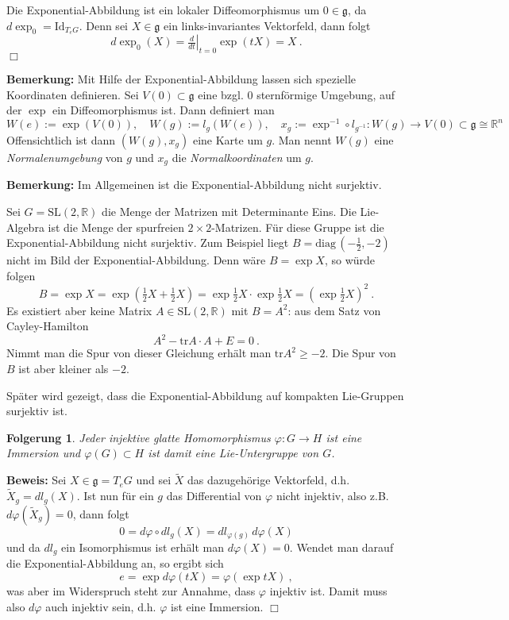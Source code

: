\documentclass[12pt,a4paper]{article}
\def\R{\mathbb{R}}
\def\SL{\mathrm{SL}}
\def\g{\mathfrak{g}}
\def\diag{\mathrm{diag}\,}
\def\tr{\mathrm{tr}}
\def\Id{\mathrm{Id}}
\newtheorem{Folgerung}[Lemma]{Folgerung}
\def\proof{\noindent\textbf{Beweis:}\quad}
\def\qed{\quad\hfill\ensuremath{\Box}}
\begin{document}
\medskip

Die Exponential-Abbildung ist ein lokaler Diffeomorphismus um $0 \in \g$, da $d \exp_0 = \Id_{T_eG}$. Denn
sei $X\in \g$ ein links-invariantes Vektorfeld, dann folgt
$$
d \exp_0 (X) =\left. \tfrac{d}{dt}\right|_{t=0} \exp(tX) = X \ .
$$
\qed

\bigskip

{\bf Bemerkung:}
Mit Hilfe der Exponential-Abbildung lassen sich spezielle Koordinaten definieren. Sei
$V(0) \subset \g$ eine bzgl. $0$ sternf\"ormige Umgebung, auf der $\exp$ ein
Diffeomorphismus ist. Dann definiert man
$$
W(e) := \exp (V(0)), \quad W(g) := l_g(W(e)), \quad x_g:= \exp^{-1}\circ l_{g^{-1}}:W(g) \rightarrow V(0)\subset \g \cong \R^n
$$
Offensichtlich ist dann $(W(g), x_g)$ eine Karte um $g$. Man nennt $W(g)$ eine {\it Normalenumgebung} von $g$ und $x_g$ die
{\it Normalkoordinaten} um $g$.

\bigskip

{\bf Bemerkung:}
Im Allgemeinen ist die Exponential-Abbildung nicht surjektiv.

\medskip

Sei $G= \SL(2,\R)$ die Menge
der Matrizen mit Determinante Eins. Die Lie-Algebra ist die Menge der spurfreien $2\times 2$-Matrizen.
F\"ur diese Gruppe ist die Exponential-Abbildung nicht surjektiv.
Zum Beispiel liegt $B = \diag(-\frac12,-2)$ nicht im Bild der Exponential-Abbildung. Denn w\"are $B = \exp X$,
so w\"urde folgen
$$
B = \exp X =  \exp (\tfrac12 X + \tfrac12 X) = \exp\tfrac12X \cdot \exp\tfrac12X = (\exp\tfrac12X)^2 \ .
$$
Es existiert
aber keine Matrix $A \in \SL(2,\R)$  mit $B=A^2$: aus dem Satz von Cayley-Hamilton
$$
A^2 - \tr A \cdot A + E = 0 \ .
$$
Nimmt man die Spur von dieser Gleichung erh\"alt man $\tr A^2 \ge -2$. Die Spur von $B$ ist aber kleiner als $-2$.

\medskip

Sp\"ater wird gezeigt, dass die Exponential-Abbildung auf kompakten Lie-Gruppen surjektiv ist.

\bigskip

\begin{Folgerung}\label{xxx}
Jeder injektive glatte Homomorphismus $\varphi : G \rightarrow H$ ist eine Immersion und $\varphi(G)\subset H$
ist damit eine Lie-Untergruppe von $G$.
\end{Folgerung}
\proof
Sei $X \in \g = T_eG$ und sei $\tilde X$ das dazugeh\"orige Vektorfeld, d.h. $\tilde X_g = dl_g (X)$. Ist nun
f\"ur ein $g$ das Differential von $\varphi$ nicht injektiv, also z.B. $d\varphi(\tilde X_g)=0$, dann folgt
$$
0  =  d\varphi \circ dl_g(X) = dl_{\varphi(g)}\,d\varphi(X)
$$
und da $dl_g$ ein Isomorphismus ist erh\"alt man $d\varphi(X)=0$. Wendet man darauf die Exponential-Abbildung an,
so ergibt sich
$$
e = \exp d\varphi(tX) = \varphi(\exp tX) \ ,
$$
was aber im Widerspruch steht zur Annahme, dass $\varphi$ injektiv ist. Damit muss also $d\varphi$ auch injektiv sein,
d.h. $\varphi$ ist eine Immersion.
\qed
\end{document}
